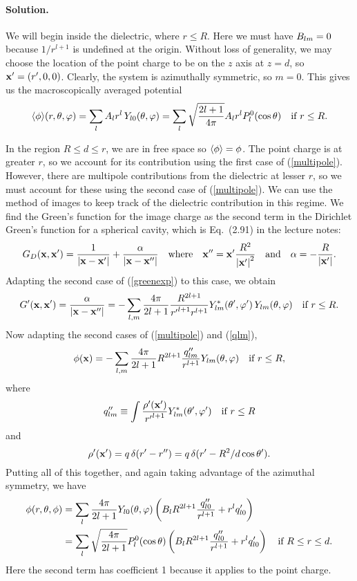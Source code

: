 \documentclass[11pt]{article}
\newcommand{\refeq}[1]{(\ref{#1})}
\newcommand{\beq}{\begin{equation*}}
\newcommand{\eeq}{\end{equation*}}
\newcommand{\beqn}{\begin{equation}}
\newcommand{\eeqn}{\end{equation}}
\newenvironment{solution}
{
    \paragraph{Solution.}
    \ignorespaces
}
{
    \bigskip
}
\begin{document}
\begin{solution}
	We will begin inside the dielectric, where $r \leq R$.  Here we must have $B_{l m} = 0$ because $1/r^{l+1}$ is undefined at the origin.  Without loss of generality, we may choose the location of the point charge to be on the $z$ axis at $z = d$, so $\vb{x}' = (r', 0, 0)$.  Clearly, the system is azimuthally symmetric, so $m = 0$.  This gives us the macroscopically averaged potential
	\beqn \label{inside}
		\evphi\!(r, \tht, \vph) = \sum_{l} \Al r^l \, Y_{l 0}\tv
		= \sum_{l} \sqrt{\frac{2l + 1}{4\pi}} \Al r^l \Ploct \quad \tif r \leq R.
	\eeqn
	
	In the region $R \leq d \leq r$, we are in free space so $\evphi = \phi$.  The point charge is at greater $r$, so we account for its contribution using the first case of \refeq{multipole}.  However, there are multipole contributions from the dielectric at lesser $r$, so we must account for these using the second case of \refeq{multipole}.  We can use the method of images to keep track of the dielectric contribution in this regime.  We find the Green's function for the image charge as the second term in the Dirichlet Green's function for a spherical cavity, which is Eq.~(2.91) in the lecture notes:
	\beq
		\Gdxxp = \frac{1}{\abs{\vx - \vx'}} + \frac{\alp}{\abs{\vx - \vx''}}
		\qq{where} \vx'' = \vx' \frac{R^2}{\abs{\vx'}^2}
		\qand \alp = -\frac{R}{\abs{\vx'}}.
	\eeq
	Adapting the second case of \refeq{greenexp} to this case, we obtain
	\beq
		\Gpxxp = \frac{\alp}{\abs{\vx - \vx''}}
		= -\sum_{l,m} \frac{4\pi}{2l + 1} \frac{R^{2l+1}}{{r'}^{l+1} r^{l + 1}} \Ylm^*\tvp \, \Ylm\tv \quad \tif r \leq R.
	\eeq
	Now adapting the second cases of \refeq{multipole} and \refeq{qlm},
	\beq
		\phix = -\sum_{l,m} \frac{4\pi}{2l+1} R^{2l+1} \frac{\qpplm}{r^{l+1}} \Ylm\tv \quad \tif r \leq R,
	\eeq
	where
	\beq
		\qpplm \equiv \int \frac{\rhopxp}{{r'}^{l+1}} \Ylm^*\tvp \quad \tif r \leq R
	\eeq
	and
	\beq
		\rhopxp = q \, \delta(r' - r'')
		= q \, \delta(r' - R^2 / d\cost').
	\eeq
	Putting all of this together, and again taking advantage of the azimuthal symmetry, we have
	\begin{align}
		\phi(r, \theta, \phi) &= \sum_{l} \frac{4\pi}{2l+1} Y_{l 0}(\theta, \varphi) \left( B_l R^{2l+1} \frac{q''_{l 0}}{r^{l+1}} + r^l q'_{l 0} \right) \notag \\
		&= \sum_{l} \sqrt{\frac{4\pi}{2l+1}} P_l^0(\cos\theta) \left( B_l R^{2l+1} \frac{q''_{l 0}}{r^{l+1}} + r^l q'_{l 0} \right) \quad \text{if } R \leq r \leq d. \label{middle}
	\end{align}
	Here the second term has coefficient 1 because it applies to the point charge.
	

\end{solution}
\end{document}
